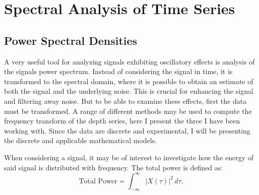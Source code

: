 \documentclass[../../CompleteThesis2/Complete_2ndDraft]{subfiles}
\begin{document}
\begin{figure}[h]
	\caption{}
	\label{Fig:COMPMETH_Flowchart}
\end{figure}



\section[Spectral Transforms]{Spectral Analysis of Time Series}
\label{Sec:SignalAnalysis_SpectralAnalysis}

\subsection[PSD][PSD]{Power Spectral Densities}
\label{Subsec:SignalAnalysis_BackDiffusion_SpectralAnalysis_PSD}
A very useful tool for analyzing signals exhibiting oscillatory effects is analysis of the signals power spectrum. Instead of considering the signal in time, it is transformed to the spectral domain, where it is possible to obtain an estimate of both the signal and the underlying noise. This is crucial for enhancing the signal and filtering away noise. But to be able to examine these effects, first the data must be transformed. A range of different methods may be used to compute the frequency transform of the depth series, here I present the three I have been working with. Since the data are discrete and experimental, I will be presenting the discrete and applicable mathematical models.

When considering a signal, it may be of interest to investigate how the energy of said signal is distributed with frequency. The total power is defined as:
\begin{equation}
	\text{Total Power} = \int_{-\infty}^{\infty} |X(\tau)|^2 \, d\tau.
	\label{Eq:SignalEnergy}
\end{equation}
\end{document}
